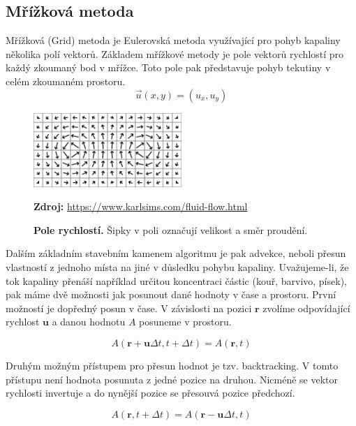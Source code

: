 \subsection{Mřížková metoda}
\label{chapter:Grid}
Mřížková (Grid) metoda je Eulerovská metoda využívající pro pohyb kapaliny několika polí vektorů. Základem mřížkové metody je pole vektorů rychlostí pro každý zkoumaný bod v mřížce. Toto pole pak představuje pohyb tekutiny v celém zkoumaném prostoru.
\begin{equation}
    \Vec{u}(x,y) = (u_x,u_y)
\end{equation}

\begin{figure}[hbt]
	\centering
	\includegraphics[width=0.5\textwidth]{obrazky-figures/flow-field.png}
	\caption{\textbf{Pole rychlostí.} Šipky v poli označují velikost a směr proudění.}
	\textbf{Zdroj: } \url{https://www.karlsims.com/fluid-flow.html}
	\label{fig:EulerGrid}
\end{figure}

Dalším základním stavebním kamenem algoritmu je pak advekce, neboli přesun vlastností z jednoho místa na jiné v důsledku pohybu kapaliny. Uvažujeme-li, že tok kapaliny přenáší například určitou koncentraci částic (kouř, barvivo, písek), pak máme dvě možnosti jak posunout dané hodnoty v čase a prostoru.  První možností je dopředný posun v čase. V závislosti na pozici $\mathbf{r}$ zvolíme odpovídající rychlost $\mathbf{u}$ a danou hodnotu $A$ posuneme v prostoru. 

\begin{equation}
     A(\mathbf{r} + \mathbf{u}\Delta t, t + \Delta t) = A(\mathbf{r}, t)
\end{equation}

Druhým možným přístupem pro přesun hodnot je tzv. backtracking. V tomto přístupu není hodnota posunuta z jedné pozice na druhou. Nicméně se vektor rychlosti invertuje a do nynější pozice se přesouvá pozice předchozí. \cite{webglFluid}

\begin{equation}
    A(\mathbf{r}, t + \Delta t) = A(\mathbf{r} - \mathbf{u}\Delta t, t)
\end{equation}

